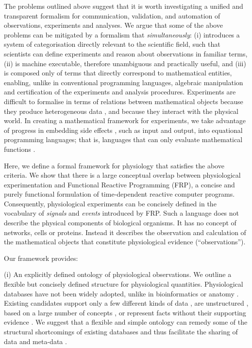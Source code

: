 The problems outlined above suggest that it is worth investigating a
unified and transparent formalism for communication, validation, and
automation of observations, experiments and analyses. We argue that
some of the above problems can be mitigated by a formalism that
\emph{simultaneously}: (i) introduces a system of categorisation
directly relevant to the scientific field, such that scientists can
define experiments and reason about observations in familiar terms,
(ii) is machine executable, therefore unambiguous and practically
useful, and (iii) is composed only of terms that directly correspond
to mathematical entities, enabling, unlike in conventional programming
languages, algebraic manipulation and certification of the experiments
and analysis procedures.  Experiments are difficult to formalise in
terms of relations between mathematical objects because they produce
heterogeneous data \cite{Tukey1962}, and because they interact with
the physical world. In creating a mathematical framework for
experiments, we take advantage of progress in embedding side effects
\cite{PeytonJones2002, Roy2004, Wadler1995}, such as input and output,
into equational programming languages; that is, languages that can
only evaluate mathematical functions \cite{Church1941}.

Here, we define a formal framework for physiology
that satisfies the above criteria. We show that there
is a large conceptual overlap between physiological experimentation
and Functional Reactive Programming (FRP\cite{Elliott1997,
  Nilsson2002}), a concise and purely functional formulation of
time-dependent reactive computer programs. Consequently, physiological
experiments can be concisely defined in the vocabulary of
\emph{signals} and \emph{events} introduced by FRP. Such a language
does not describe the physical components of biological organisms. It
has no concept of networks, cells or proteins. Instead it describes
the observation and calculation of the mathematical objects that
constitute physiological evidence (``observations'').

Our framework provides:

(i) An explicitly defined ontology of physiological observations. We
outline a flexible but concisely defined structure for physiological
quantities.  Physiological databases have not been widely adopted,
unlike in bioinformatics or anatomy \cite{Herz2008,
  Amari2002}. Existing candidates support only a few different kinds
of data \cite{Jessop2010}, are unstructured \cite{Teeters2008},
based on a large number of concepts \cite{Frishkoff2009}, or represent
facts without their supporting evidence \cite{Katz2010}.
We suggest that a flexible and simple ontology can remedy some of the
structural shortcomings\cite{Gardner2005, Amari2002} of existing
databases and thus facilitate the sharing of data and meta-data
\cite{Insel2003}.

